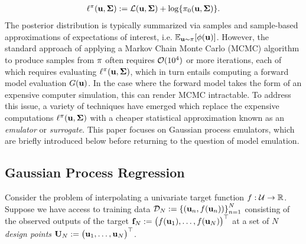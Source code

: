 \documentclass[12pt]{article}
\begin{document}
\begin{align*}
\logUnPost(\bpar, \CovObs) := \llik(\bpar, \CovObs) + \Log{\priorDens(\bpar, \CovObs)}.
\end{align*}
The posterior distribution is typically summarized via samples and sample-based approximations of expectations of interest, i.e. $\E_{\bpar \sim \postDens}[\phi(\bpar)]$.
However, the standard approach of applying a Markov Chain Monte Carlo (MCMC) algorithm to produce samples from $\postDens$ often requires 
$\BigO(10^4)$ or more iterations, each of which requires evaluating $\logUnPost(\bpar, \CovObs)$, which 
in turn entails computing a forward model evaluation $\fwd(\bpar)$. In the  case where the forward model takes the form of an expensive computer simulation, this 
can render MCMC intractable. To address this issue, a variety of techniques have emerged which replace the expensive computations 
$\logUnPost(\bpar, \CovObs)$ with a cheaper statistical approximation known as an \textit{emulator} or \textit{surrogate}. This paper focuses on Gaussian process 
emulators, which are briefly introduced below before returning to the question of model emulation. 

\subsection{Gaussian Process Regression}
Consider the problem of interpolating a univariate target function $\f: \parSpace \to \R$. Suppose we have access to training data 
$\designData_{\Ndesign} := \left\{(\bpar_{\designIdx}, \f(\bpar_{\designIdx}))\right\}_{\designIdx = 1}^{\Ndesign}$ consisting of the observed outputs of the target 
$\fObs[\Ndesign] :=  \begin{pmatrix} \f(\bpar_1), \dots, \f(\bpar_\Ndesign) \end{pmatrix}^\top$ at a set of $N$ 
\textit{design points} $\designMat[\Ndesign] := \begin{pmatrix} \bpar_1, \dots, \bpar_N \end{pmatrix}^\top$. 
\end{document}
